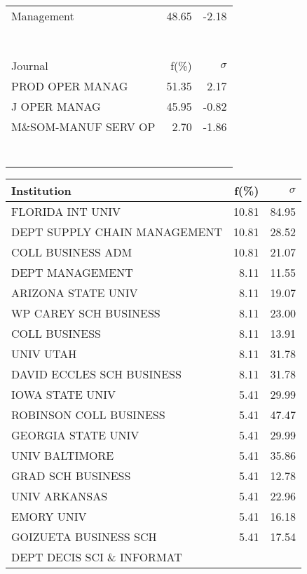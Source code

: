 \documentclass[a4paper,11pt]{report}
\begin{document}
\begin{landscape}
\begin{table}[!ht]
{\begin{tabular}{|l r r|}
Management & 48.65 & -2.18\\
 &  & \\
 &  & \\
 &  & \\
 &  & \\
 &  & \\
 &  & \\
 &  & \\
\hline
\hline
Journal & f(\%) & $\sigma$\\
\hline
PROD OPER MANAG & 51.35 & 2.17\\
J OPER MANAG & 45.95 & -0.82\\
M\&SOM-MANUF SERV OP & 2.70 & -1.86\\
 &  & \\
 &  & \\
 &  & \\
 &  & \\
 &  & \\
 &  & \\
 &  & \\
\hline
\end{tabular}
}
{\scriptsize\begin{tabular}{|l r r|}
\hline
Institution & f(\%) & $\sigma$\\
\hline
FLORIDA INT UNIV & 10.81 & 84.95\\
DEPT SUPPLY CHAIN MANAGEMENT & 10.81 & 28.52\\
COLL BUSINESS ADM & 10.81 & 21.07\\
DEPT MANAGEMENT & 8.11 & 11.55\\
ARIZONA STATE UNIV & 8.11 & 19.07\\
WP CAREY SCH BUSINESS & 8.11 & 23.00\\
COLL BUSINESS & 8.11 & 13.91\\
UNIV UTAH & 8.11 & 31.78\\
DAVID ECCLES SCH BUSINESS & 8.11 & 31.78\\
IOWA STATE UNIV & 5.41 & 29.99\\
ROBINSON COLL BUSINESS & 5.41 & 47.47\\
GEORGIA STATE UNIV & 5.41 & 29.99\\
UNIV BALTIMORE & 5.41 & 35.86\\
GRAD SCH BUSINESS & 5.41 & 12.78\\
UNIV ARKANSAS & 5.41 & 22.96\\
EMORY UNIV & 5.41 & 16.18\\
GOIZUETA BUSINESS SCH & 5.41 & 17.54\\
DEPT DECIS SCI \& INFORMAT &  & \\

\end{tabular}}
\end{table}
\end{landscape}
\end{document}
